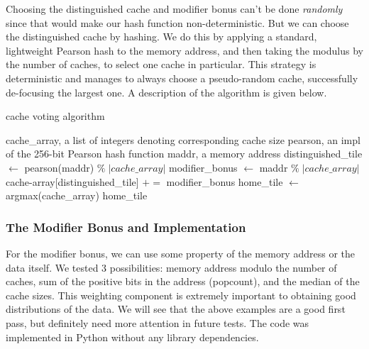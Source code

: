 Choosing the distinguished cache and modifier bonus can't be done
\textit{randomly} since that would make our hash function non-deterministic. But
we can choose the distinguished cache by hashing. We do this by applying a
standard, lightweight Pearson hash to the memory address, and then taking the
modulus by the number of caches, to select one cache in particular. This
strategy is deterministic and manages to always choose a pseudo-random cache,
successfully de-focusing the largest one.  A description of the algorithm is
given below.

\begin{algorithm}
  \caption{cache voting algorithm}
  \begin{algorithmic}[1]
    \REQUIRE cache\_array, a list of integers denoting corresponding cache size
    \REQUIRE pearson, an impl of the 256-bit Pearson hash function
    \REQUIRE maddr, a memory address
    \STATE distinguished\_tile $\leftarrow$ pearson(maddr) $ \% \; |cache\_array| $
    \STATE modifier\_bonus $\leftarrow$ maddr $ \% \; |cache\_array|$
    \STATE cache-array[distinguished\_tile] $+=$ modifier\_bonus
    \STATE home\_tile $\leftarrow$ argmax(cache\_array)
    \RETURN home\_tile
  \end{algorithmic}
\end{algorithm}

\subsubsection{The Modifier Bonus and Implementation }

For the modifier bonus, we can use some property of the memory address or the
data itself. We tested 3 possibilities: memory address modulo the number of
caches, sum of the positive bits in the address (popcount), and the median of
the cache sizes. This weighting component is extremely important to obtaining
good distributions of the data. We will see that the above examples are a good
first pass, but definitely need more attention in future tests.  The code was
implemented in Python without any library dependencies.

